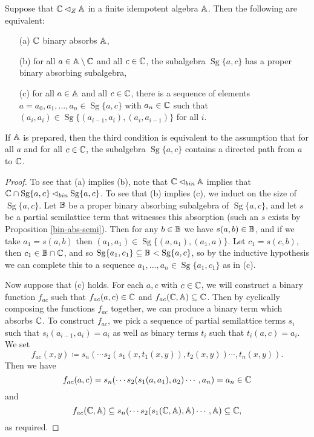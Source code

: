 \documentclass[letterpaper,11pt]{article}
\DeclareMathOperator{\Sg}{Sg}
\begin{document}
\begin{prop}\label{bin-central-criterion} Suppose that $\mathbb{C} \lhd_Z \mathbb{A}$ in a finite idempotent algebra $\mathbb{A}$. Then the following are equivalent:
\begin{itemize}
\item[(a)] $\mathbb{C}$ binary absorbs $\mathbb{A}$,
\item[(b)] for all $a \in \mathbb{A}\setminus \mathbb{C}$ and all $c \in \mathbb{C}$, the subalgebra $\Sg\{a,c\}$ has a proper binary absorbing subalgebra,
\item[(c)] for all $a \in \mathbb{A}$ and all $c \in \mathbb{C}$, there is a sequence of elements $a = a_0, a_1, ..., a_n \in \Sg\{a,c\}$ with $a_n \in \mathbb{C}$ such that $(a_i,a_i) \in \Sg\{(a_{i-1},a_i),(a_i,a_{i-1})\}$ for all $i$.
\end{itemize}
If $\mathbb{A}$ is prepared, then the third condition is equivalent to the assumption that for all $a$ and for all $c \in \mathbb{C}$, the subalgebra $\Sg\{a,c\}$ contains a directed path from $a$ to $\mathbb{C}$.
\end{prop}
\begin{proof} To see that (a) implies (b), note that $\mathbb{C} \lhd_{bin} \mathbb{A}$ implies that $\bC \cap \Sg\{a,c\} \lhd_{bin} \Sg\{a,c\}$. To see that (b) implies (c), we induct on the size of $\Sg\{a,c\}$. Let $\mathbb{B}$ be a proper binary absorbing subalgebra of $\Sg\{a,c\}$, and let $s$ be a partial semilattice term that witnesses this absorption (such an $s$ exists by Proposition \ref{bin-abs-semi}). Then for any $b \in \mathbb{B}$ we have $s(a,b) \in \mathbb{B}$, and if we take $a_1 = s(a,b)$ then $(a_1,a_1) \in \Sg\{(a,a_1),(a_1,a)\}$. Let $c_1 = s(c,b)$, then $c_1 \in \mathbb{B} \cap \mathbb{C}$, and so $\Sg\{a_1,c_1\} \subseteq \bB < \Sg\{a,c\}$, so by the inductive hypothesis we can complete this to a sequence $a_1, ..., a_n \in \Sg\{a_1,c_1\}$ as in (c).

Now suppose that (c) holds. For each $a,c$ with $c \in \mathbb{C}$, we will construct a binary function $f_{ac}$ such that $f_{ac}(a,c) \in \mathbb{C}$ and $f_{ac}(\mathbb{C},\mathbb{A}) \subseteq \mathbb{C}$. Then by cyclically composing the functions $f_{ac}$ together, we can produce a binary term which absorbs $\mathbb{C}$. To construct $f_{ac}$, we pick a sequence of partial semilattice terms $s_i$ such that $s_i(a_{i-1},a_i) = a_i$ as well as binary terms $t_i$ such that $t_i(a,c) = a_i$. We set
\[
f_{ac}(x,y) \coloneqq s_n(\cdots s_2(s_1(x,t_1(x,y)),t_2(x,y))\cdots,t_n(x,y)).
\]
Then we have
\[
f_{ac}(a,c) = s_n(\cdots s_2(s_1(a,a_1),a_2)\cdots,a_n) = a_n \in \mathbb{C}
\]
and
\[
f_{ac}(\mathbb{C},\mathbb{A}) \subseteq s_n(\cdots s_2(s_1(\mathbb{C},\mathbb{A}),\mathbb{A})\cdots,\mathbb{A}) \subseteq \mathbb{C},
\]
as required.
\end{proof}
\end{document}
